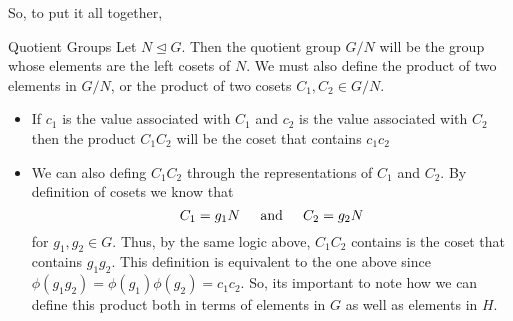 So, to put it all together,
\begin{definition}{Quotient Groups}{}
    Let $N \trianglelefteq G$. Then the quotient group $G/N$ will be the group whose elements are the left cosets of $N$. We must also define the product of two elements in $G/N$, or the product of two cosets $C_1, C_2 \in G/N$. 
    \begin{itemize}
        \item If $c_1$ is the value associated with $C_1$ and $c_2$ is the value associated with $C_2$ then the product $C_1C_2$ will be the coset that contains $c_1c_2$
        \item We can also defing $C_1C_2$ through the representations of $C_1$ and $C_2$. By definition of cosets we know that 
        \begin{equation*}
            C_1 = g_1N \hspace{0.2in} \text{and} \hspace{0.2in} C_2 = g_2N
        \end{equation*}
        for $g_1, g_2 \in G$. Thus, by the same logic above, $C_1C_2$ contains is the coset that contains $g_1g_2$. This definition is equivalent to the one above since $\phi\left(g_1g_2\right) = \phi\left(g_1\right)\phi\left(g_2\right) = c_1c_2$. So, its important to note how we can define this product both in terms of elements in $G$ as well as elements in $H$.
    \end{itemize}
\end{definition}